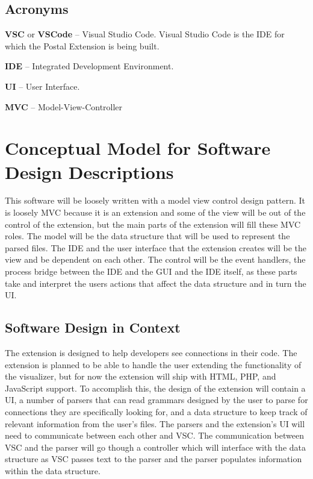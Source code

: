 \documentclass[letterpaper,10pt,titlepage,draftclsnofoot,onecolumn,onesided] {IEEEtran}
\begin{document}
\subsection{Acronyms}
\textbf{VSC} or \textbf{VSCode} -- Visual Studio Code. Visual Studio Code is the IDE for which the Postal Extension is being built. 

\textbf{IDE} -- Integrated Development Environment. 

\textbf{UI} -- User Interface. 

\textbf{MVC} -- Model-View-Controller


\section{Conceptual Model for Software Design Descriptions}
This software will be loosely written with a model view control design pattern.
It is loosely MVC because it is an extension and some of the view will be out of the control of the extension, but the main parts of the extension will fill these MVC roles.
The model will be the data structure that will be used to represent the parsed files. 
The IDE and the user interface that the extension creates will be the view and be dependent on each other.
The control will be the event handlers, the process bridge between the IDE and the GUI and the IDE itself, as these parts take and interpret the users actions that affect the data structure and in turn the UI.

\subsection{Software Design in Context}
The extension is designed to help developers see connections in their code.
The extension is planned to be able to handle the user extending the functionality of the visualizer, but for now the extension will ship with HTML, PHP, and JavaScript support.
To accomplish this, the design of the extension will contain a UI, a number of parsers that can read grammars designed by the user to parse for connections they are specifically looking for, and a data structure to keep track of relevant information from the user's files.
The parsers and the extension's UI will need to communicate between each other and VSC.
The communication between VSC and the parser will go though a controller which will interface with the data structure as VSC passes text to the parser and the parser populates information within the data structure.
\end{document}
